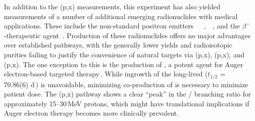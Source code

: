 In addition to the (p,x) measurements, this experiment has also yielded measurements of  a number of additional  emerging radionuclides with medical applications.
These include the non-standard positron emitters 
\,\cite{Muller2013,Filosofov2010,Qaim2011}
\,\cite{Thisgaard2011,Zaman1996,Hermanne2000a}
\,\cite{PMID:7632762,zweit1996medium,Graves2016,Rosch2014}, 
\,\cite{Szelecsenyi2005a,Fukumura2004}
\,\cite{Lewis2003,Bandari2014,mp500671j,Szelecsenyi1993,Aslam2009,Hilgers2003,Szelecsenyi2005,Voyles2017},
and the $\beta^-$-therapeutic agent 
\,\cite{Muller2014,Deilami-nezhad2016}.
Production of these radionuclides offers no major advantages over established pathways, with the generally lower yields and radioisotopic purities failing to justify the convenience of natural targets  via   (p,x), (p,x), and  (p,x). 
The one exception to this is the production of , a potent agent for Auger electron-based targeted therapy\,\cite{Thisgaard2011a,Valdovinos2017b,Thisgaard2014a}.
While ingrowth of the long-lived  ($t_{1/2}$ = 70.86(6) d\,\cite{Nesaraja2010}) is unavoidable, minimizing co-production of  is necessary to minimize patient dose.
The (p,x) pathway shows a clear \enquote{peak} in the / branching ratio for approximately 15--30\,MeV protons, which might have translational implications if Auger electron therapy becomes more clinically prevalent. 





